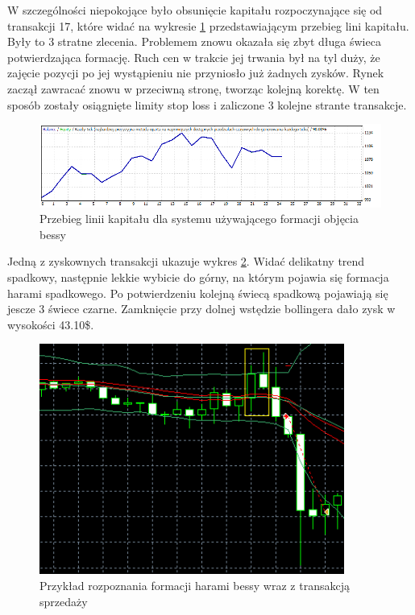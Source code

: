 \documentclass[pdflatex,11pt]{aghdpl}
\begin{document}
W szczególności niepokojące było obsunięcie kapitału rozpoczynające się od transakcji 17, które widać na wykresie \ref{linia_kap_harami} przedstawiającym przebieg lini kapitału. Były to 3 stratne zlecenia. Problemem znowu okazała się zbyt długa świeca potwierdzająca formację. Ruch cen w trakcie jej trwania był na tyl duży, że zajęcie pozycji po jej wystąpieniu nie przyniosło już żadnych zysków. Rynek zaczął zawracać znowu w przeciwną stronę, tworząc kolejną korektę. W ten sposób zostały osiągnięte limity stop loss i zaliczone 3 kolejne strante transakcje.
\begin{figure}[h!]
\begin{center}
\includegraphics[width=16cm]{bearishharami/linia_kap.png}
\caption{Przebieg linii kapitału dla systemu używającego formacji objęcia bessy}
\label{linia_kap_harami}
\end{center}
\end{figure} 

Jedną z zyskownych transakcji ukazuje wykres \ref{przyklad_harami_bessy}. Widać delikatny trend spadkowy, następnie lekkie wybicie do górny, na którym pojawia się formacja harami spadkowego. Po potwierdzeniu kolejną świecą spadkową pojawiają się jescze 3 świece czarne. Zamknięcie przy dolnej wstędzie bollingera dało zysk w wysokości 43.10\$. 
\begin{figure}[h!]
\begin{center}
\includegraphics[width=10cm]{bearishharami/przyklad.png}
\caption{Przykład rozpoznania formacji harami bessy wraz z transakcją sprzedaży}
\label{przyklad_harami_bessy}
\end{center}
\end{figure} 
% 
% 



\end{document}

